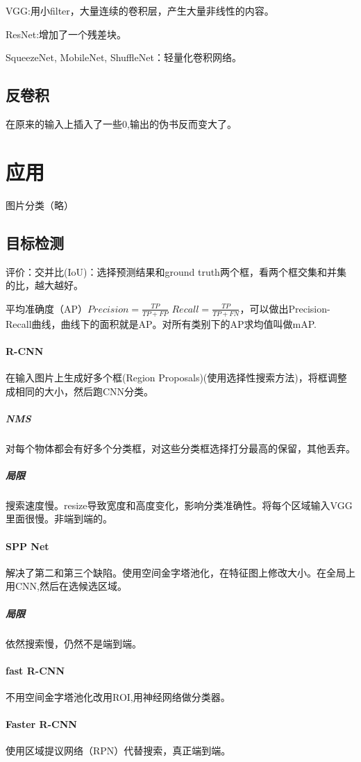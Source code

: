 \documentclass[UTF8]{ctexart}
\begin{document}
VGG:用小filter，大量连续的卷积层，产生大量非线性的内容。

ResNet:增加了一个残差块。

SqueezeNet, MobileNet, ShuffleNet：轻量化卷积网络。

\subsection{反卷积}
在原来的输入上插入了一些0,输出的伪书反而变大了。

\section{应用}
图片分类（略）
\subsection{目标检测}
评价：交并比(IoU)：选择预测结果和ground truth两个框，看两个框交集和并集的比，越大越好。

平均准确度（AP）$Precision = \frac{TP}{TP + FP}$
$Recall = \frac{TP}{TP + FN}$，可以做出Precision-Recall曲线，曲线下的面积就是AP。对所有类别下的AP求均值叫做mAP.

\paragraph{R-CNN}
在输入图片上生成好多个框(Region Proposals)(使用选择性搜索方法)，将框调整成相同的大小，然后跑CNN分类。
\subparagraph{NMS}对每个物体都会有好多个分类框，对这些分类框选择打分最高的保留，其他丢弃。
\subparagraph{局限}搜索速度慢。resize导致宽度和高度变化，影响分类准确性。将每个区域输入VGG里面很慢。非端到端的。

\paragraph{SPP Net}解决了第二和第三个缺陷。使用空间金字塔池化，在特征图上修改大小。在全局上用CNN,然后在选候选区域。
\subparagraph{局限}依然搜索慢，仍然不是端到端。

\paragraph{fast R-CNN}不用空间金字塔池化改用ROI,用神经网络做分类器。

\paragraph{Faster R-CNN}使用区域提议网络（RPN）代替搜索，真正端到端。
\end{document}
